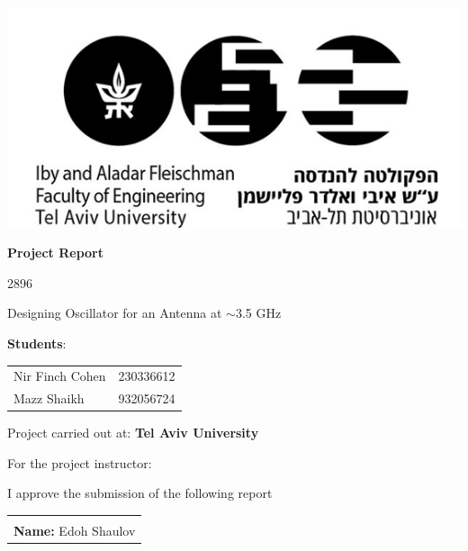 \documentclass[]{article}
\begin{document}
\begin{titlepage}
    \centering
    \includegraphics[scale=0.8]{TAU.png}\par\vspace{1cm}
    {\LARGE\bfseries Project Report\par}
    \vspace{1cm}
    {\Large 2896\par}
    \vspace{0.5cm}
    {\Large Designing Oscillator for an Antenna at $\sim$3.5 GHz\par}
    \vspace{1cm}
    
    \Large \textbf{Students}:\par
    \vspace{0.5cm}
    \begin{tabular}{l l}
        Nir Finch Cohen & 230336612 \\
        Mazz Shaikh & 932056724 \\
    \end{tabular}\par
    \vspace{1cm}
    
    \Large Project carried out at: \textbf{Tel Aviv University}\par
    \vspace{1cm}
    
    \Large For the project instructor:\par
    \vspace{0.3cm}
    
    I approve the submission of the following report\par
    \vspace{1cm}
    
    \begin{flushright}
        \begin{tabular}{l}
            \\
            \\
            \textbf{Name:} Edoh Shaulov \\
        \end{tabular}
    \end{flushright}
\end{titlepage}


\tableofcontents


\newpage








\newpage


\end{document}
